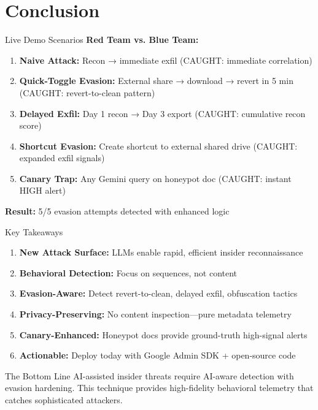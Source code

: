 \documentclass[aspectratio=169]{beamer}
\begin{document}
\section{Conclusion}

\begin{frame}{Live Demo Scenarios}
\textbf{Red Team vs. Blue Team:}

\vspace{1em}

\begin{enumerate}
    \item \textbf{Naive Attack:} Recon → immediate exfil (CAUGHT: immediate correlation)
    \item \textbf{Quick-Toggle Evasion:} External share → download → revert in 5 min (CAUGHT: revert-to-clean pattern)
    \item \textbf{Delayed Exfil:} Day 1 recon → Day 3 export (CAUGHT: cumulative recon score)
    \item \textbf{Shortcut Evasion:} Create shortcut to external shared drive (CAUGHT: expanded exfil signals)
    \item \textbf{Canary Trap:} Any Gemini query on honeypot doc (CAUGHT: instant HIGH alert)
\end{enumerate}

\vspace{1em}

\textbf{Result:} 5/5 evasion attempts detected with enhanced logic
\end{frame}

\begin{frame}{Key Takeaways}
\begin{enumerate}
    \item \textbf{New Attack Surface:} LLMs enable rapid, efficient insider reconnaissance
    \item \textbf{Behavioral Detection:} Focus on sequences, not content
    \item \textbf{Evasion-Aware:} Detect revert-to-clean, delayed exfil, obfuscation tactics
    \item \textbf{Privacy-Preserving:} No content inspection—pure metadata telemetry
    \item \textbf{Canary-Enhanced:} Honeypot docs provide ground-truth high-signal alerts
    \item \textbf{Actionable:} Deploy today with Google Admin SDK + open-source code
\end{enumerate}

\vspace{1em}

\begin{block}{The Bottom Line}
AI-assisted insider threats require AI-aware detection with evasion hardening. This technique provides high-fidelity behavioral telemetry that catches sophisticated attackers.
\end{block}
\end{frame}
\end{document}
